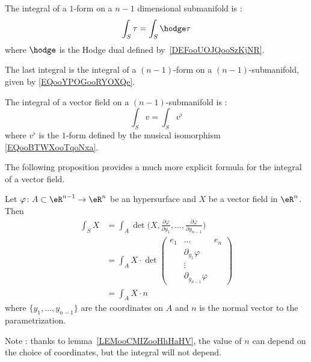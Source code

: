 \begin{definition}       \label{DEFooAXFXooWiMLKP}
	The integral of a \( 1\)-form on a \( n-1\) dimensional submanifold is :
	\begin{equation}
		\int_S\tau=\int_S\hodge\tau
	\end{equation}
	where \( \hodge\) is the Hodge dual defined by~\ref{DEFooUOJQooSzKjNR}.
\end{definition}
The last integral is the integral of a \( (n-1)\)-form on a \( (n-1)\)-submanifold, given by \eqref{EQooYPOGooRYOXQe}.

\begin{definition}      \label{DEFooAXZGooJairMQ}
	The integral of a vector field on a \( (n-1)\)-submanifold is :
	\begin{equation}
		\int_Sv=\int_Sv^{\flat}
	\end{equation}
	where \( v^{\flat}\) is the \( 1\)-form defined by the musical isomorphism \eqref{EQooBTWXooTqoNxa}.
\end{definition}

The following proposition provides a much more explicit formula for the integral of a vector field.

\begin{proposition}     \label{PROPooETLZooAVsrwy}
	Let \( \varphi\colon A\subset \eR^{n-1}\to \eR^n\) be an hypersurface and \( X\) be a vector field in \( \eR^n\). Then
	\begin{subequations}
		\begin{align}
			\int_SX & =\int_A\det\big( X,\frac{ \partial \varphi }{ \partial y_1 },\ldots, \frac{ \partial \varphi }{ \partial y_{n-1} } \big)  \label{SUBEQooWJSPooImJjQN} \\
			        & =\int_A X\cdot\det\begin{pmatrix}
				                            e_1 & \ldots                    & e_n \\
				                                & \partial_{y_1}\varphi     &     \\
				                                & \vdots                    &     \\
				                                & \partial_{y_{n-1}}\varphi &
			                            \end{pmatrix}                                                                        \\
			        & =\int_A X\cdot n
		\end{align}
	\end{subequations}
	where \( \{ y_1,\ldots, y_{n-1} \}\) are the coordinates on \( A\) and \( n\) is the normal vector to the parametrization.
\end{proposition}
Note : thanks to lemma~\ref{LEMooCMIZooHhHaHV}, the value of \( n\) can depend on the choice of coordinates, but the integral will not depend.

